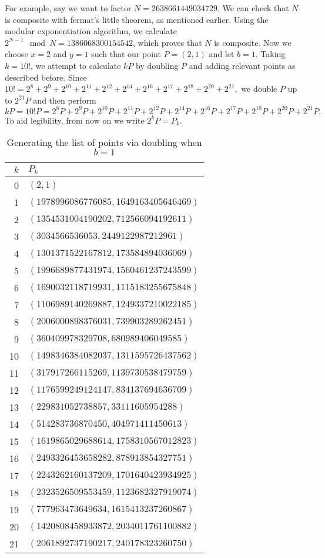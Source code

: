For example, say we want to factor $N = 2638661449034729$.
We can check that $N$ is composite with fermat's little theorem, as mentioned earlier.
Using the modular exponentiation algorithm, we calculate $2^{N-1} \mod N = 1386068300154542$, which proves that $N$ is composite.
Now we choose $x=2$ and $y=1$ such that our point $P = (2,1)$ and let $b = 1$.
Taking $k=10!$, we attempt to calculate $kP$ by doubling $P$ and adding relevant points as described before.
Since $10! = 2^{8} + 2^{9} + 2^{10} + 2^{11} + 2^{12} + 2^{14} + 2^{16} + 2^{17} + 2^{18} + 2^{20} + 2^{21},$ we double $P$ up to $2^{21}P$ and then perform
$$kP = 10!P = 2^{8}P + 2^{9}P + 2^{10}P + 2^{11}P + 2^{12}P + 2^{14}P + 2^{16}P + 2^{17}P + 2^{18}P + 2^{20}P + 2^{21}P.$$
To aid legibility, from now on we write $2^k P = P_k$.

\begin{table}[htbp]
	\centering
	\begin{tabular}{r|l}
		$k$ & $P_k$\\
		\hline
		0 & $(2, 1)$\\
		1 & $(1978996086776085, 1649163405646469)$\\
		2 & $(1354531004190202, 712566094192611)$\\
		3 & $(3034566536053, 2449122987212961)$\\
		4 & $(1301371522167812, 173584894036069)$\\
		5 & $(1996689877431974, 1560461237243599)$\\
		6 & $(1690032118719931, 1115183255675848)$\\
		7 & $(1106989140269887, 1249337210022185)$\\
		8 & $(2006000898376031, 739903289262451)$\\
		9 & $(360409978329708, 680989406049585)$\\
		10 & $(1498346384082037, 1311595726437562)$\\
		11 & $(317917266115269, 1139730538479759)$\\
		12 & $(1176599249124147, 834137694636709)$\\
		13 & $(229831052738857, 33111605954288)$\\
		14 & $(514283736870450, 404971411450613)$\\
		15 & $(1619865029688614, 1758310567012823)$\\
		16 & $(2493326453658282, 878913854327751)$\\
		17 & $(2243262160137209, 1701640423934925)$\\
		18 & $(2323526509553459, 1123682327919074)$\\
		19 & $(777963473649634, 1615413237260867)$\\
		20 & $(1420808458933872, 2034011761100882)$\\
		21 & $(2061892737190217, 240178323260750)$
	\end{tabular}
	\caption{Generating the list of points via doubling when $b=1$}
	\label{unsuccessfuldouble}
\end{table}

